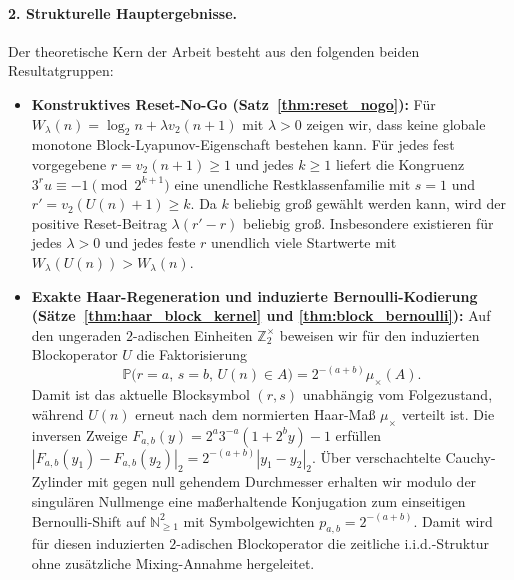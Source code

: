 \documentclass[11pt,reqno]{amsart}
\theoremstyle{definition}
\theoremstyle{remark}
\numberwithin{equation}{section}
\begin{document}
\paragraph{2. Strukturelle Hauptergebnisse.}
Der theoretische Kern der Arbeit besteht aus den folgenden beiden Resultatgruppen:
\begin{itemize}
\item \textbf{Konstruktives Reset-No-Go (Satz~\ref{thm:reset_nogo}):} F\"ur $W_\lambda(n) = \log_2 n + \lambda v_2(n+1)$ mit $\lambda > 0$ zeigen wir, dass keine globale monotone Block-Lyapunov-Eigenschaft bestehen kann. F\"ur jedes fest vorgegebene $r = v_2(n+1) \ge 1$ und jedes $k \ge 1$ liefert die Kongruenz $3^r u \equiv -1 \pmod{2^{k+1}}$ eine unendliche Restklassenfamilie mit $s = 1$ und $r' = v_2(U(n)+1) \ge k$. Da $k$ beliebig gro\ss{} gew\"ahlt werden kann, wird der positive Reset-Beitrag $\lambda(r' - r)$ beliebig gro\ss{}. Insbesondere existieren f\"ur jedes $\lambda > 0$ und jedes feste $r$ unendlich viele Startwerte mit $W_\lambda(U(n)) > W_\lambda(n)$.
\item \textbf{Exakte Haar-Regeneration und induzierte Bernoulli-Kodierung (S\"atze~\ref{thm:haar_block_kernel} und \ref{thm:block_bernoulli}):} Auf den ungeraden $2$-adischen Einheiten $\mathbb{Z}_2^\times$ beweisen wir f\"ur den induzierten Blockoperator $U$ die Faktorisierung
\begin{equation}
\mathbb{P}\bigl(r = a, \, s = b, \, U(n) \in A\bigr) = 2^{-(a+b)} \mu_\times(A).
\end{equation}
Damit ist das aktuelle Blocksymbol $(r, s)$ unabh\"angig vom Folgezustand, w\"ahrend $U(n)$ erneut nach dem normierten Haar-Ma\ss{} $\mu_\times$ verteilt ist. Die inversen Zweige $F_{a,b}(y) = 2^a 3^{-a}(1 + 2^b y) - 1$ erf\"ullen $|F_{a,b}(y_1) - F_{a,b}(y_2)|_2 = 2^{-(a+b)} |y_1 - y_2|_2$. \"Uber verschachtelte Cauchy-Zylinder mit gegen null gehendem Durchmesser erhalten wir modulo der singul\"aren Nullmenge eine ma\ss{}erhaltende Konjugation zum einseitigen Bernoulli-Shift auf $\mathbb{N}_{\ge1}^2$ mit Symbolgewichten $p_{a,b} = 2^{-(a+b)}$. Damit wird f\"ur diesen induzierten $2$-adischen Blockoperator die zeitliche i.i.d.-Struktur ohne zus\"atzliche Mixing-Annahme hergeleitet.
\end{itemize}
\end{document}
